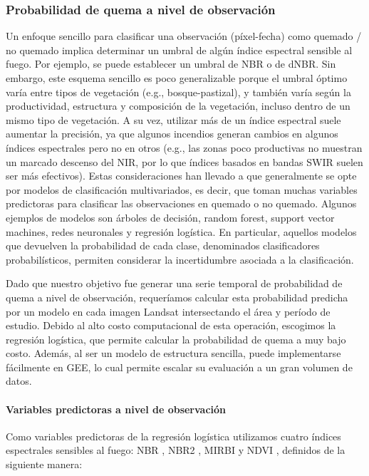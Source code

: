 \documentclass[11pt,a4paper]{article}
\begin{document}
\subsubsection{Probabilidad de quema a nivel de observación}

Un enfoque sencillo para clasificar una observación (píxel-fecha) como quemado / no quemado implica determinar un umbral de algún índice espectral sensible al fuego. Por ejemplo, se puede establecer un umbral de NBR o de dNBR. Sin embargo, este esquema sencillo es poco generalizable porque el umbral óptimo varía entre tipos de vegetación (e.g., bosque-pastizal), y también varía según la productividad, estructura y composición de la vegetación, incluso dentro de un mismo tipo de vegetación. A su vez, utilizar más de un índice espectral suele aumentar la precisión, ya que algunos incendios generan cambios en algunos índices espectrales pero no en otros (e.g., las zonas poco productivas no muestran un marcado descenso del NIR, por lo que índices basados en bandas SWIR suelen ser más efectivos). Estas consideraciones han llevado a que generalmente se opte por modelos de clasificación multivariados, es decir, que toman muchas variables predictoras para clasificar las observaciones en quemado o no quemado. Algunos ejemplos de modelos son árboles de decisión, random forest, support vector machines, redes neuronales y regresión logística. En particular, aquellos modelos que devuelven la probabilidad de cada clase, denominados clasificadores probabilísticos, permiten considerar la incertidumbre asociada a la clasificación.

Dado que nuestro objetivo fue generar una serie temporal de probabilidad de quema a nivel de observación, requeríamos calcular esta probabilidad predicha por un modelo en cada imagen Landsat intersectando el área y período de estudio. Debido al alto costo computacional de esta operación, escogimos la regresión logística, que permite calcular la probabilidad de quema a muy bajo costo. Además, al ser un modelo de estructura sencilla, puede implementarse fácilmente en GEE, lo cual permite escalar su evaluación a un gran volumen de datos.

\paragraph{Variables predictoras a nivel de observación}

Como variables predictoras de la regresión logística utilizamos cuatro índices espectrales sensibles al fuego: NBR \parencite{key_benson_2006}, NBR2 \parencite{usgs_landsat_burned_area_2021}, MIRBI \parencite{trigg_flasse_2001} y NDVI \parencite{tucker_1979}, definidos de la siguiente manera:
\end{document}
